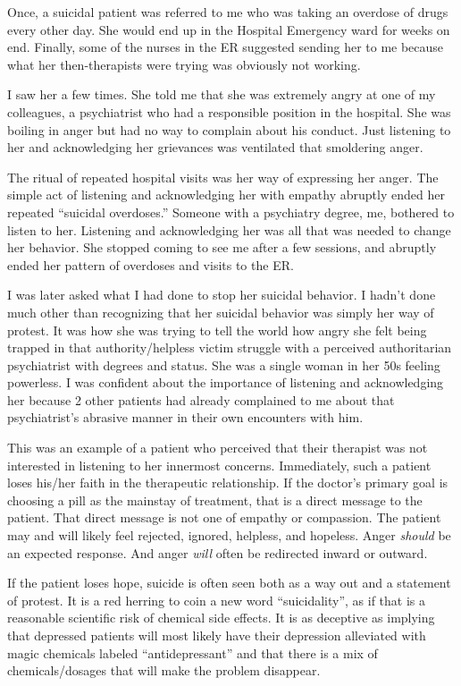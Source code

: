 \documentclass[]{book}
\begin{document}
Once, a suicidal patient was referred to me who was taking an overdose of drugs every other day. She would end up in the Hospital Emergency ward for weeks on end. Finally, some of the nurses in the ER suggested sending her to me because what her then-therapists were trying was obviously not working.

I saw her a few times. She told me that she was extremely angry at one of my colleagues, a psychiatrist who had a responsible position in the hospital. She was boiling in anger but had no way to complain about his conduct. Just listening to her and acknowledging her grievances was ventilated that smoldering anger.

The ritual of repeated hospital visits was her way of expressing her anger. The simple act of listening and acknowledging her with empathy abruptly ended her repeated ``suicidal overdoses.'' Someone with a psychiatry degree, me, bothered to listen to her. Listening and acknowledging her was all that was needed to change her behavior. She stopped coming to see me after a few sessions, and abruptly ended her pattern of overdoses and visits to the ER.

I was later asked what I had done to stop her suicidal behavior. I hadn't done much other than recognizing that her suicidal behavior was simply her way of protest. It was how she was trying to tell the world how angry she felt being trapped in that authority/helpless victim struggle with a perceived authoritarian psychiatrist with degrees and status. She was a single woman in her 50s feeling powerless. I was confident about the importance of listening and acknowledging her because 2 other patients had already complained to me about that psychiatrist's abrasive manner in their own encounters with him.

This was an example of a patient who perceived that their therapist was not interested in listening to her innermost concerns. Immediately, such a patient loses his/her faith in the therapeutic relationship. If the doctor's primary goal is choosing a pill as the mainstay of treatment, that is a direct message to the patient. That direct message is not one of empathy or compassion. The patient may and will likely feel rejected, ignored, helpless, and hopeless. Anger \emph{should} be an expected response. And anger \emph{will} often be redirected inward or outward.

If the patient loses hope, suicide is often seen both as a way out and a statement of protest. It is a red herring to coin a new word ``suicidality'', as if that is a reasonable scientific risk of chemical side effects. It is as deceptive as implying that depressed patients will most likely have their depression alleviated with magic chemicals labeled ``antidepressant'' and that there is a mix of chemicals/dosages that will make the problem disappear.
\end{document}
